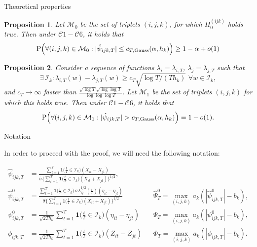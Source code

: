 \documentclass[10pt]{beamer}
\newcommand{\Prob}{\mathrm{P}}
\newtheorem{prop}{Proposition}
\newcommand{\ind}{\boldsymbol{1}\Big( \frac{t}{T} \in \mathcal{I}_k \Big)} %
\newcommand{\indsmall}{\boldsymbol{1}\big( \frac{t}{T} \in \mathcal{I}_k \big)} %
\begin{document}
\begin{frame}{Theoretical properties}
\begin{prop}\label{prop1}
Let $\mathcal{M}_0$ be the set of triplets $(i, j, k)$, for which $H_0^{(ijk)}$ holds true. Then under $\mathcal{C}1 - \mathcal{C}6$, it holds that 
\vspace{-2mm}
\begin{align*}
 \Prob\Big( \forall (i,j,k) \in \mathcal{M}_0: |\hat{\psi}_{ijk,T}| \le c_{T,\textnormal{Gauss}}(\alpha,h_k) \Big) \ge 1 - \alpha + o(1)
\end{align*}
\end{prop}\pause
\begin{prop}\label{prop2}
Consider a sequence of functions $\lambda_{i} = \lambda_{i,T}$, $\lambda_{j} = \lambda_{j, T}$ such that $$\exists \, \mathcal{I}_{k}:  \lambda_{i, T}(w) - \lambda_{j, T}(w) \ge c_T \sqrt{\log T / (T h_{k})} \,\, \forall w \in \mathcal{I}_{k},$$ and $c_T \rightarrow \infty$ faster than $\frac{\sqrt{\log T}\sqrt{\log \log T}}{\log \log \log T}$. Let $\mathcal{M}_1$ be the set of triplets $(i, j, k)$ for which this holds true. Then under $\mathcal{C}1 - \mathcal{C}6$, it holds that
\vspace{-2mm}
\begin{equation*}
\Prob\Big( \forall (i,j,k) \in \mathcal{M}_1: |\hat{\psi}_{ijk,T}| > c_{T,\textnormal{Gauss}}(\alpha,h_k) \Big) = 1 - o(1).
\end{equation*}
\end{prop}
\end{frame}

\begin{frame}{Notation}
\begin{center}
In order to proceed with the proof, we will need the following notation:
\end{center}
\vspace{-2mm}
\begin{align*}
\widehat{\psi}_{ijk, T} &= \frac{\sum\nolimits_{t=1}^T \indsmall (X_{it} -X_{jt})}{\hat{\sigma} \big\{ \sum\nolimits_{t=1}^T \indsmall  (X_{it} + X_{jt} )\big\}^{1/2}}, &&\\
\hat{\psi}_{ijk,T}^0 &= \frac{\sum\nolimits_{t=1}^T \indsmall \, \sigma \overline{\lambda}_{ij}^{1/2}(\frac{t}{T}) (\eta_{it} - \eta_{jt})}{ \hat{\sigma} \{ \sum\nolimits_{t=1}^T \indsmall (X_{it} + X_{jt}) \}^{1/2}} &&\hat{\Psi}_T^0 = \max_{(i,j,k)} a_k (|\hat{\psi}_{ijk,T}^0| - b_k),\\
\psi_{ijk,T}^0 &= \frac{1}{\sqrt{2Th_k}} \sum\limits_{t=1}^T \ind (\eta_{it} - \eta_{jt}) &&\Psi_T = \max_{(i,j,k)} a_k (|\psi_{ijk,T}^0| - b_k),\\
\phi_{ijk,T} &= \frac{1}{\sqrt{2 T h_k}} \sum\limits_{t=1}^T \ind (Z_{it} - Z_{jt}) &&\Phi_T = \max_{(i,j,k)} a_k (|\phi_{ijk,T}| - b_k).
\end{align*}
\end{frame}
\end{document}
